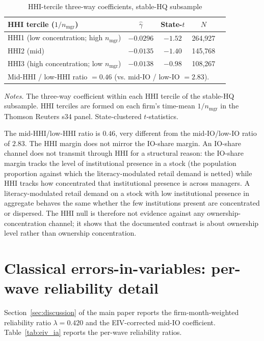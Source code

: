 \documentclass[12pt]{article}
\begin{document}
\begin{table}[h]
\centering
\caption{HHI-tercile three-way coefficients, stable-HQ subsample}
\label{tab:hhi_ia}
\footnotesize
\begin{tabular}{lcccr}
\toprule
HHI tercile ($1/n_{\text{mgr}}$) & $\hat\gamma$ & State-$t$ & $N$ \\
\midrule
HHI1 (low concentration; high $n_{\text{mgr}}$)  & $-0.0296$ & $-1.52$ & 264,927 \\
HHI2 (mid)                                       & $-0.0135$ & $-1.40$ & 145,768 \\
HHI3 (high concentration; low $n_{\text{mgr}}$)  & $-0.0138$ & $-0.98$ & 108,267 \\
\midrule
\multicolumn{4}{l}{Mid-HHI / low-HHI ratio $= 0.46$ (vs. mid-IO / low-IO $= 2.83$).} \\
\bottomrule
\end{tabular}

\medskip
{\footnotesize\textit{Notes.} The three-way coefficient within each HHI tercile of the stable-HQ subsample. HHI terciles are formed on each firm's time-mean $1/n_{\text{mgr}}$ in the Thomson Reuters s34 panel. State-clustered $t$-statistics.}
\end{table}

The mid-HHI/low-HHI ratio is $0.46$, very different from the mid-IO/low-IO ratio of $2.83$. The HHI margin does not mirror the IO-share margin. An IO-share channel does not transmit through HHI for a structural reason: the IO-share margin tracks the level of institutional presence in a stock (the population proportion against which the literacy-modulated retail demand is netted) while HHI tracks how concentrated that institutional presence is across managers. A literacy-modulated retail demand on a stock with low institutional presence in aggregate behaves the same whether the few institutions present are concentrated or dispersed. The HHI null is therefore not evidence against any ownership-concentration channel; it shows that the documented contrast is about ownership level rather than ownership concentration.

\section{Classical errors-in-variables: per-wave reliability detail}
\label{ia:eiv}

Section~\ref{sec:discussion} of the main paper reports the firm-month-weighted reliability ratio $\lambda = 0.420$ and the EIV-corrected mid-IO coefficient. Table~\ref{tab:eiv_ia} reports the per-wave reliability ratios.
\end{document}
